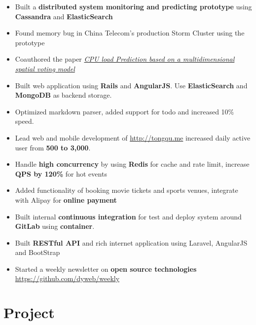 \documentclass[10pt, letterpaper]{simple-cv}
\begin{document}
\begin{itemize}
\item Built a \textbf{distributed system monitoring and predicting prototype} using \textbf{Cassandra} and \textbf{ElasticSearch}
\item Found memory bug in China Telecom's production Storm Cluster using the prototype
\item Coauthored the paper \textit{\href{https://at15.github.io/pub/cpu_load_prediction.pdf}{CPU load Prediction based on a multidimensional spatial voting model}}
\end{itemize}

\begin{itemize}
\item Built web application using \textbf{Rails} and \textbf{AngularJS}. Use \textbf{ElasticSearch} and \textbf{MongoDB} as backend storage.
\item Optimized markdown parser, added support for todo and increased 10\% speed.
\end{itemize}

\begin{itemize}
\item Lead web and mobile development of \url{http://tongqu.me} increased daily active user from \textbf{500 to 3,000}.
\item Handle \textbf{high concurrency} by using \textbf{Redis} for cache and rate limit, increase \textbf{QPS by 120\%} for hot events
\item Added functionality of booking movie tickets and sports venues, integrate with Alipay for \textbf{online payment}
\item Built internal \textbf{continuous integration} for test and deploy system around \textbf{GitLab} using \textbf{container}.
\item Built \textbf{RESTful API} and rich internet application using Laravel, AngularJS and BootStrap
\item Started a weekly newsletter on \textbf{open source technologies} \url{https://github.com/dyweb/weekly}
\end{itemize}

\section{Project}
\end{document}
